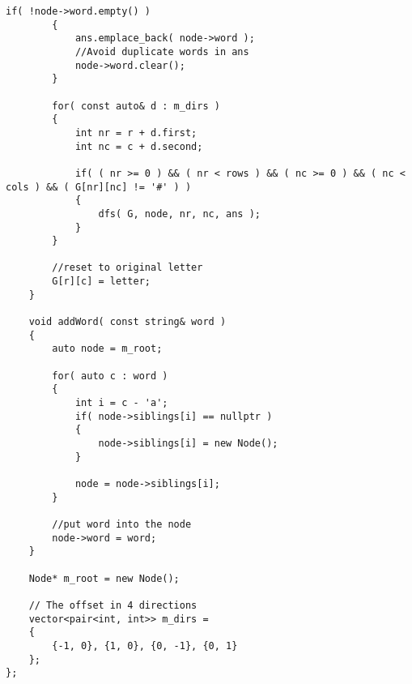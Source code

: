 \begin{lstlisting}[style=customc, caption={DFS And Trie}]
        if( !node->word.empty() )
        {
            ans.emplace_back( node->word );
			//Avoid duplicate words in ans
            node->word.clear();
        }

        for( const auto& d : m_dirs )
        {
            int nr = r + d.first;
            int nc = c + d.second;

            if( ( nr >= 0 ) && ( nr < rows ) && ( nc >= 0 ) && ( nc < cols ) && ( G[nr][nc] != '#' ) )
            {
                dfs( G, node, nr, nc, ans );
            }
        }

		//reset to original letter
        G[r][c] = letter; 
    }

    void addWord( const string& word )
    {
        auto node = m_root;

        for( auto c : word )
        {
            int i = c - 'a';
            if( node->siblings[i] == nullptr )
            {
                node->siblings[i] = new Node();
            }

            node = node->siblings[i];
        }

		//put word into the node
        node->word = word;
    }

    Node* m_root = new Node();
	
	// The offset in 4 directions
    vector<pair<int, int>> m_dirs =
    {
        {-1, 0}, {1, 0}, {0, -1}, {0, 1}
    };
};
\end{lstlisting}
